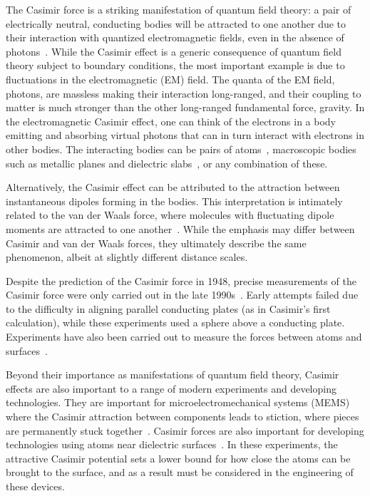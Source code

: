 The Casimir force is a striking manifestation of quantum field theory: a pair of electrically neutral,
 conducting bodies will be attracted to one another due to their interaction
with quantized electromagnetic fields, even in the absence of photons~\cite{Casimir1948}.  
While the Casimir effect is a generic consequence of quantum field theory subject to boundary conditions,
the most important example is due to fluctuations in the electromagnetic (EM) field.  The quanta of the 
EM field, photons, are massless making their interaction long-ranged, and their coupling to matter is much stronger
than the other long-ranged fundamental force, gravity.  
In the electromagnetic Casimir effect, one can think of the electrons in a body emitting and absorbing virtual photons that can in turn
interact with electrons in other bodies.  The interacting bodies can be pairs of atoms~\cite{CasimirPolder1948}, 
macroscopic bodies such as metallic planes and dielectric slabs~\cite{Lifshitz1956}, or any combination of these.

Alternatively, the Casimir effect can be attributed to the attraction between instantaneous dipoles forming in the bodies.  
This interpretation is intimately related to the van der Waals force, where 
molecules with fluctuating dipole moments are attracted to one another~\cite{vanderWaals}.
While the emphasis may differ between Casimir and van der Waals forces, they ultimately describe the 
same phenomenon, albeit at slightly different distance scales.  

Despite the prediction of the Casimir force in 1948, precise measurements of the Casimir force were only
carried out in the late 1990s~\cite{Lamoreaux1997,Mohideen1998}.  Early attempts failed due to the difficulty
in aligning parallel conducting plates (as in Casimir's first calculation), while these experiments used a
sphere above a conducting plate.  Experiments have also been
carried out to measure the forces between atoms and surfaces~\cite{Sukenik1993,Perreault2005,Harber2005}.

Beyond their importance as manifestations of quantum field theory, Casimir effects are also 
important to a range of modern experiments and developing technologies.
They are important for microelectromechanical systems (MEMS) where the Casimir attraction between components 
leads to stiction, where pieces are permanently stuck together~\cite{Buks2001}.  
Casimir forces are also important for developing technologies using atoms near dielectric surfaces~\cite{Folman2000,Alton2011, Hung2013}.
In these experiments, the attractive Casimir potential sets a lower bound for how
close the atoms can be brought to the surface, and as a result must be considered in the engineering 
of these devices.

